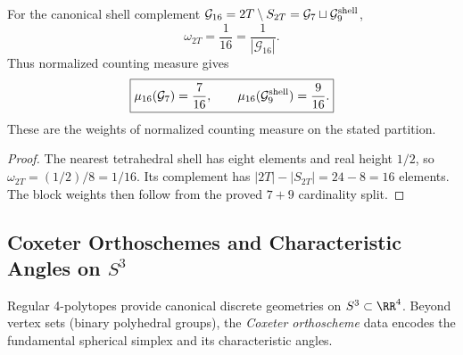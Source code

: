 \documentclass[11pt]{article}
\begin{document}
\begin{corollary}
\label{p1:cor:2T-shell-complement-counting-atom}
For the canonical shell complement
\(\mathcal G_{16}=2T\setminus S_{2T}
=\mathcal G_7\sqcup\mathcal G_9^{\rm shell}\),
\begin{equation}
\label{p1:eq:2T-shell-complement-counting-atom}
 \boxed{\omega_{2T}=\frac1{16}=\frac1{|\mathcal G_{16}|}.}
\end{equation}
Thus normalized counting measure gives
\begin{equation}
\label{p1:eq:G16-counting-weights}
 \boxed{\mu_{16}(\mathcal G_7)=\frac7{16},\qquad
 \mu_{16}(\mathcal G_9^{\rm shell})=\frac9{16}.}
\end{equation}
These are the weights of normalized counting measure on the stated partition.
\end{corollary}

\begin{proof}
The nearest tetrahedral shell has eight elements and real height \(1/2\), so
\(\omega_{2T}=(1/2)/8=1/16\).  Its complement has
\(|2T|-|S_{2T}|=24-8=16\) elements.  The block weights then follow from
the proved \(7+9\) cardinality split.
\end{proof}

\subsection{\texorpdfstring{Coxeter Orthoschemes and Characteristic Angles on $S^3$}{Coxeter Orthoschemes and Characteristic Angles on S3}}
\label{p1:sec:coxeter}

Regular 4-polytopes provide canonical discrete geometries on $S^3\subset\RR^4$.
Beyond vertex sets (binary polyhedral groups), the \emph{Coxeter orthoscheme} data
encodes the fundamental spherical simplex and its characteristic angles.
\end{document}
